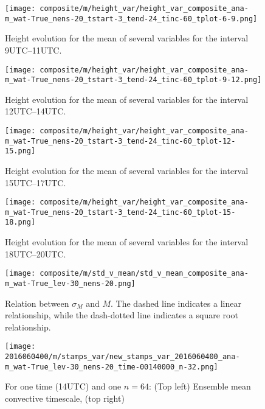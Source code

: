 \documentclass[a4paper, 12pt]{article}
\begin{document}
\begin{figure}[ht]
\noindent \centering
\texttt{[image: composite/m/height\_var/height\_var\_composite\_ana-m\_wat-True\_nens-20\_tstart-3\_tend-24\_tinc-60\_tplot-6-9.png]}\\
\caption{Height evolution for the mean of several variables for the interval 9UTC--11UTC.} \label{fig:comp_height_var}
\end{figure}
\begin{figure}[ht]
\noindent \centering
\texttt{[image: composite/m/height\_var/height\_var\_composite\_ana-m\_wat-True\_nens-20\_tstart-3\_tend-24\_tinc-60\_tplot-9-12.png]}\\
\caption{Height evolution for the mean of several variables for the interval 12UTC--14UTC.} 
\end{figure}
\begin{figure}[ht]
\noindent \centering
\texttt{[image: composite/m/height\_var/height\_var\_composite\_ana-m\_wat-True\_nens-20\_tstart-3\_tend-24\_tinc-60\_tplot-12-15.png]}\\
\caption{Height evolution for the mean of several variables for the interval 15UTC--17UTC.}
\end{figure}
\begin{figure}[ht]
\noindent \centering
\texttt{[image: composite/m/height\_var/height\_var\_composite\_ana-m\_wat-True\_nens-20\_tstart-3\_tend-24\_tinc-60\_tplot-15-18.png]}\\
\caption{Height evolution for the mean of several variables for the interval 18UTC--20UTC.}
\end{figure}

\begin{figure}[ht]
\noindent \centering
\texttt{[image: composite/m/std\_v\_mean/std\_v\_mean\_composite\_ana-m\_wat-True\_lev-30\_nens-20.png]}\\
\caption{Relation between $\sigma_M$ and $M$. The dashed line indicates a linear relationship, while the dash-dotted line indicates a square root relationship.} \label{fig:comp_std_v_mean}
\end{figure}


\begin{figure}[ht]
\noindent \centering
\texttt{[image: 2016060400/m/stamps\_var/new\_stamps\_var\_2016060400\_ana-m\_wat-True\_lev-30\_nens-20\_time-00140000\_n-32.png]}\\
\caption{For one time (14UTC) and one $n=64$: (Top left) Ensemble mean convective timescale, (top right) } \label{fig:ex_stamps_corr}
\end{figure}

% 
\end{document}
